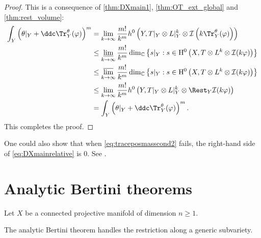 \begin{proof}
This is a consequence of \cref{thm:DXmain1}, \cref{thm:OT_ext_global} and \cref{thm:rest_volume}:
\[
\begin{aligned}
    \int_Y \left(\theta|_Y+\ddc \Tr_Y^{\theta}(\varphi)\right)^m  & = \lim_{k \to \infty} \frac{m!}{k^m} h^0\left(Y,T|_Y\otimes L|_Y^k\otimes \mathcal{I}\left(k \Tr_Y^{\theta}(\varphi)\right)\right)\\
    & \leq  \varliminf_{k \to \infty} \frac{m!}{k^m} \dim_{\mathbb C}\left\{ s|_Y:  s\in \mathrm{H}^0\left(X,T\otimes L^k \otimes \mathcal{I}(k\varphi)\right)\right\}\\
    & \leq  \varlimsup_{k \to \infty} \frac{m!}{k^m} \dim_{\mathbb C}\left\{ s|_Y:  s\in \mathrm{H}^0\left(X,T\otimes L^k \otimes \mathcal{I}(k\varphi)\right)\right\}\\
  & \leq  \lim_{k \to \infty} \frac{m!}{k^m} h^0\left(Y ,T|_Y\otimes L|_Y^k\otimes \Rest_Y\mathcal{I}(k\varphi)\right)\\
  & =  \int_Y \left(\theta|_Y+\ddc \Tr_Y^{\theta}(\varphi)\right)^m.
  \end{aligned}
\]
This completes the proof.
\end{proof}

\begin{remark}
    One could also show that when \eqref{eq:traceposmasscond2} fails, the right-hand side of \eqref{eq:DXmainrelative} is $0$. See \cite{DX24}.
\end{remark}


\section{Analytic Bertini theorems}\label{sec:ABT}
Let $X$ be a connected projective manifold of dimension $n\geq 1$.

The analytic Bertini theorem handles the restriction along a generic subvariety.

